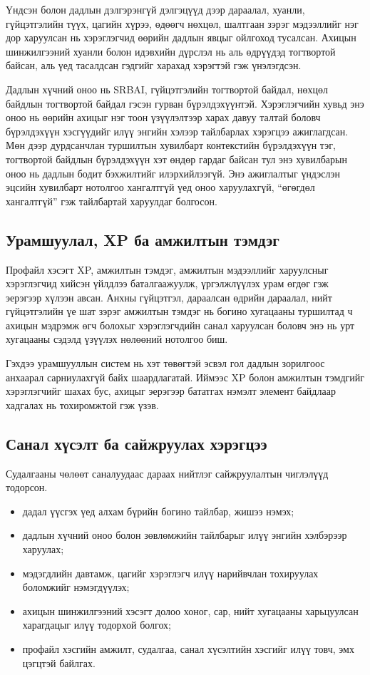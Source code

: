 Үндсэн болон дадлын дэлгэрэнгүй дэлгэцүүд дээр дараалал, хуанли, гүйцэтгэлийн түүх, цагийн хүрээ, өдөөгч нөхцөл, шалтгаан зэрэг мэдээллийг нэг дор харуулсан нь хэрэглэгчид өөрийн дадлын явцыг ойлгоход тусалсан. Ахицын шинжилгээний хуанли болон идэвхийн дүрслэл нь аль өдрүүдэд тогтвортой байсан, аль үед тасалдсан гэдгийг харахад хэрэгтэй гэж үнэлэгдсэн.

Дадлын хүчний оноо нь SRBAI, гүйцэтгэлийн тогтвортой байдал, нөхцөл байдлын тогтвортой байдал гэсэн гурван бүрэлдэхүүнтэй. Хэрэглэгчийн хувьд энэ оноо нь өөрийн ахицыг нэг тоон үзүүлэлтээр харах давуу талтай боловч бүрэлдэхүүн хэсгүүдийг илүү энгийн хэлээр тайлбарлах хэрэгцээ ажиглагдсан. Мөн дээр дурдсанчлан туршилтын хувилбарт контекстийн бүрэлдэхүүн тэг, тогтвортой байдлын бүрэлдэхүүн хэт өндөр гардаг байсан тул энэ хувилбарын оноо нь дадлын бодит бэхжилтийг илэрхийлээгүй. Энэ ажиглалтыг үндэслэн эцсийн хувилбарт нотолгоо хангалтгүй үед оноо харуулахгүй, ``өгөгдөл хангалтгүй'' гэж тайлбартай харуулдаг болгосон.

\subsection{Урамшуулал, XP ба амжилтын тэмдэг}

Профайл хэсэгт XP, амжилтын тэмдэг, амжилтын мэдээллийг харуулсныг хэрэглэгчид хийсэн үйлдлээ баталгаажуулж, үргэлжлүүлэх урам өгдөг гэж эерэгээр хүлээн авсан. Анхны гүйцэтгэл, дараалсан өдрийн дараалал, нийт гүйцэтгэлийн үе шат зэрэг амжилтын тэмдэг нь богино хугацааны туршилтад ч ахицын мэдрэмж өгч болохыг хэрэглэгчдийн санал харуулсан боловч энэ нь урт хугацааны сэдэлд үзүүлэх нөлөөний нотолгоо биш.

Гэхдээ урамшууллын систем нь хэт төвөгтэй эсвэл гол дадлын зорилгоос анхаарал сарниулахгүй байх шаардлагатай. Иймээс XP болон амжилтын тэмдгийг хэрэглэгчийг шахах бус, ахицыг эерэгээр бататгах нэмэлт элемент байдлаар хадгалах нь тохиромжтой гэж үзэв.

\subsection{Санал хүсэлт ба сайжруулах хэрэгцээ}

Судалгааны чөлөөт саналуудаас дараах нийтлэг сайжруулалтын чиглэлүүд тодорсон.

\begin{itemize}
    \item дадал үүсгэх үед алхам бүрийн богино тайлбар, жишээ нэмэх;
    \item дадлын хүчний оноо болон зөвлөмжийн тайлбарыг илүү энгийн хэлбэрээр харуулах;
    \item мэдэгдлийн давтамж, цагийг хэрэглэгч илүү нарийвчлан тохируулах боломжийг нэмэгдүүлэх;
    \item ахицын шинжилгээний хэсэгт долоо хоног, сар, нийт хугацааны харьцуулсан харагдацыг илүү тодорхой болгох;
    \item профайл хэсгийн амжилт, судалгаа, санал хүсэлтийн хэсгийг илүү товч, эмх цэгцтэй байлгах.
\end{itemize}

